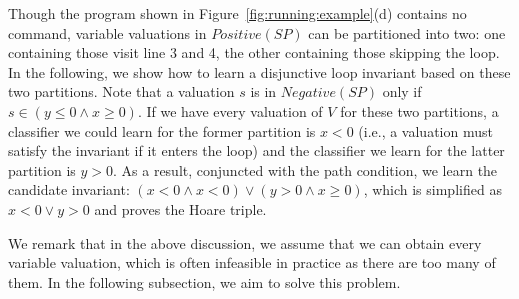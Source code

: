 \begin{example}
Though the program shown in Figure~\ref{fig:running:example}(d) contains no  command, variable valuations in $Positive(SP)$ can be partitioned into two: one containing those visit line 3 and 4, the other containing those skipping the loop. %
In the following, we show how to learn a disjunctive loop invariant based on these two partitions. Note that a valuation $s$ is in $Negative(SP)$ only if $s \in (y\leq 0 \land x \geq 0)$. If we have every valuation of $V$ for these two partitions, a classifier we could learn for the former partition is $x < 0$ (i.e., a valuation must satisfy the invariant if it enters the loop) and the classifier we learn for the latter partition is $y > 0$. As a result, conjuncted with the path condition, we learn the candidate invariant: $(x < 0 \land x < 0) \lor (y > 0 \land x \geq 0)$, which is simplified as $x < 0 \lor y > 0$ and proves the Hoare triple. 

We remark that in the above discussion, we assume that we can obtain every variable valuation, which is often infeasible in practice as there are too many of them. In the following subsection, we aim to solve this problem.
\end{example}

